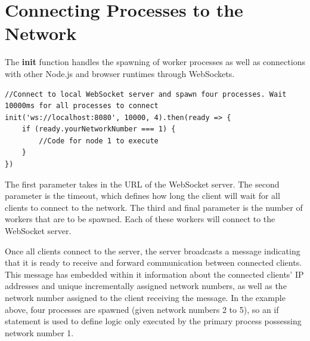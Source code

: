 \documentclass[oneside]{um-fict}
\begin{document}
\section{Connecting Processes to the Network}
The \textbf{init} function handles the spawning of worker processes as well as connections with other Node.js and browser runtimes through WebSockets.
\begin{lstlisting}
//Connect to local WebSocket server and spawn four processes. Wait 10000ms for all processes to connect
init('ws://localhost:8080', 10000, 4).then(ready => {
    if (ready.yourNetworkNumber === 1) {
        //Code for node 1 to execute
    }
})
\end{lstlisting}
 
The first parameter takes in the URL of the WebSocket server. The second parameter is the timeout, which defines how long the client will wait for all clients to connect to the network. The third and final parameter is the number of workers that are to be spawned. Each of these workers will connect to the WebSocket server.

Once all clients connect to the server, the server broadcasts a message indicating that it is ready to receive and forward communication between connected clients. This message has embedded within it information about the connected clients' IP addresses and unique incrementally assigned network numbers, as well as the network number assigned to the client receiving the message. In the example above, four processes are spawned (given network numbers 2 to 5), so an if statement is used to define logic only executed by the primary process possessing network number 1.
\end{document}
